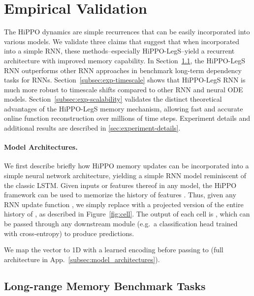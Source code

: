 \documentclass{article}
\begin{document}
 

\section{Empirical Validation}
\label{sec:experiments}

The HiPPO dynamics are simple recurrences that can be easily incorporated into various models.
We validate three claims that suggest that when incorporated into a simple RNN, these methods--especially HiPPO-LegS--yield a recurrent architecture with improved memory capability.
In Section~\ref{subsec:membenchmark}, the HiPPO-LegS RNN outperforms
other RNN approaches in benchmark long-term dependency tasks for RNNs.
Section~\ref{subsec:exp-timescale} shows that HiPPO-LegS RNN is much more robust to
timescale shifts compared to other RNN and neural ODE models.
Section~\ref{subsec:exp-scalability} validates the distinct
theoretical advantages of the HiPPO-LegS memory mechanism, allowing fast and
accurate online function reconstruction over millions of time steps.
Experiment details and additional results are described in \cref{sec:experiment-details}.



\paragraph{Model Architectures.}
We first describe briefly how HiPPO memory updates can be incorporated into a
simple neural network architecture, yielding a simple RNN model reminiscent of
the classic LSTM.
Given inputs  or features thereof  in any model, the HiPPO
framework can be used to memorize the history of features .
Thus, given any RNN update function , we simply replace
 with a projected version of the entire history of , as described in
Figure~\ref{fig:cell}.
The output of each cell is , which can be passed through any downstream module (e.g.\ a classification head trained with cross-entropy) to produce predictions.

We map the vector  to 1D with a learned encoding before passing to
 (full architecture in App.~\ref{subsec:model_architectures}).


\subsection{Long-range Memory Benchmark Tasks}
\label{subsec:membenchmark}
\end{document}
